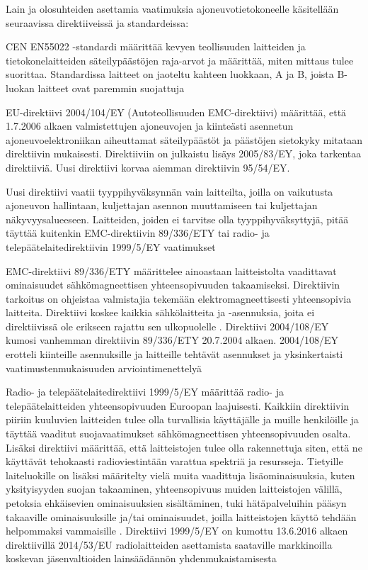 Lain ja olosuhteiden asettamia vaatimuksia ajoneuvotietokoneelle käsitellään seuraavissa direktiiveissä ja standardeissa:

CEN EN55022 -standardi määrittää kevyen teollisuuden laitteiden ja tietokonelaitteiden säteilypäästöjen raja-arvot ja määrittää, miten mittaus tulee suorittaa. Standardissa laitteet on jaoteltu kahteen luokkaan, A ja B, joista B-luokan laitteet ovat paremmin suojattuja \citep{EN55022}

EU-direktiivi 2004/104/EY (Autoteollisuuden EMC-direktiivi) määrittää, että 1.7.2006 alkaen valmistettujen ajoneuvojen ja kiinteästi asennetun ajoneuvoelektroniikan aiheuttamat säteilypäästöt ja päästöjen sietokyky mitataan direktiivin mukaisesti. Direktiiviin on julkaistu lisäys 2005/83/EY, joka tarkentaa direktiiviä. Uusi direktiivi korvaa aiemman direktiivin 95/54/EY.

Uusi direktiivi vaatii tyyppihyväksynnän vain laitteilta, joilla on
vaikutusta ajoneuvon hallintaan, kuljettajan asennon muuttamiseen tai
kuljettajan näkyvyysalueeseen. Laitteiden, joiden ei tarvitse olla
tyyppihyväksyttyjä, pitää täyttää kuitenkin EMC-direktiivin 89/336/ETY
tai radio- ja telepäätelaitedirektiivin 1999/5/EY vaatimukset \citep{1999/5/EY,89/336/ETY}

EMC-direktiivi 89/336/ETY määrittelee ainoastaan laitteistolta vaadittavat ominaisuudet sähkömagneettisen yhteensopivuuden takaamiseksi. Direktiivin tarkoitus on ohjeistaa valmistajia tekemään elektromagneettisesti yhteensopivia laitteita. Direktiivi koskee kaikkia sähkölaitteita ja -asennuksia, joita ei direktiivissä ole erikseen rajattu sen ulkopuolelle \citep{89/336/ETY}. Direktiivi 2004/108/EY kumosi vanhemman direktiivin 89/336/ETY 20.7.2004 alkaen. 2004/108/EY  erotteli kiinteille asennuksille ja laitteille tehtävät asennukset ja yksinkertaisti vaatimustenmukaisuuden arviointimenettelyä \cite{2004/108/EY}

Radio- ja telepäätelaitedirektiivi 1999/5/EY määrittää radio- ja telepäätelaitteiden yhteensopivuuden Euroopan laajuisesti. Kaikkiin direktiivin piiriin kuuluvien laitteiden tulee olla turvallisia käyttäjälle ja muille henkilöille ja täyttää vaaditut suojavaatimukset sähkömagneettisen yhteensopivuuden osalta. Lisäksi
direktiivi määrittää, että laitteistojen tulee olla rakennettuja siten, että ne käyttävät tehokaasti radioviestintään varattua spektriä ja resursseja. Tietyille laiteluokille on lisäksi määritelty vielä muita vaadittuja lisäominaisuuksia, kuten yksityisyyden suojan takaaminen, yhteensopivuus muiden laitteistojen välillä, petoksia ehkäisevien ominaisuuksien sisältäminen, tuki hätäpalveluihin pääsyn takaaville ominaisuuksille ja/tai ominaisuudet, joilla laitteistojen
käyttö tehdään helpommaksi vammaisille \citep{1999/5/EY}. Direktiivi 1999/5/EY on kumottu 13.6.2016 alkaen direktiivillä 2014/53/EU radiolaitteiden asettamista saataville markkinoilla koskevan jäsenvaltioiden lainsäädännön yhdenmukaistamisesta \cite{2014/53/EU}

